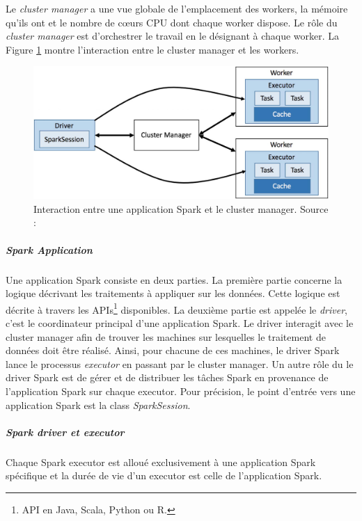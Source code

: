 Le \textit{cluster manager} a une vue globale de l'emplacement des workers, la mémoire qu'ils ont et le nombre de c\oe{}urs CPU dont chaque worker dispose. Le rôle du \textit{cluster manager} est d'orchestrer le travail en le désignant à chaque worker. La Figure \ref{fig:cluster-overview} montre l'interaction entre le cluster manager et les workers.


\begin{figure}[H]
	\centering
	\captionsetup{justification= centering}
	\includegraphics[width=0.7\linewidth]{illustrations/cluster-overview.jpg}
	\caption{ Interaction entre une application Spark et le cluster manager. Source : \cite{eginning-Apache-Spark-2-cluster-overwiew}}
	\label{fig:cluster-overview}
\end{figure}




\subparagraph{Spark Application}
Une application Spark consiste en deux parties. La première partie concerne la logique décrivant les traitements à appliquer sur les données.  Cette logique est décrite à travers les APIs\footnote{API en Java, Scala, Python ou R.} disponibles. La deuxième partie est appelée le \textit{driver}, c'est le coordinateur principal d'une application Spark. Le driver interagit avec le cluster manager afin de trouver les machines sur lesquelles le traitement de données doit être réalisé. Ainsi, pour chacune de ces machines, le driver Spark lance le processus \textit{executor} en passant par le cluster manager. Un autre rôle du le driver Spark est de gérer et de distribuer les tâches Spark en provenance de l'application Spark sur chaque executor. Pour précision, le point d'entrée vers une application Spark est la class \textit{SparkSession}.

\subparagraph{Spark driver et executor}

Chaque Spark executor est alloué exclusivement à une application Spark spécifique et la durée de vie d'un executor est celle de l'application Spark. 

